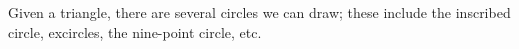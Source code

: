 Given a triangle, there are several circles we can draw; these include the
inscribed circle, excircles, the nine-point circle, etc.
